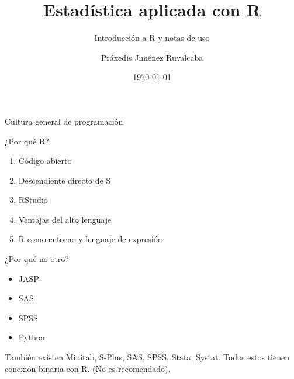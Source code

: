 \documentclass[aspectratio=169,xcolor=dvipsnames]{beamer}
\title{Estadística aplicada con R}
\subtitle{Introducción a R y notas de uso}
\author{Práxedis Jiménez Ruvalcaba}
\institute
{

}
\date{\today}
\begin{document}
\begin{frame}[c]

    \vspace{1cm}
    \begin{center}
        \insertauthor\par
        \vspace{0.5cm}
        \insertinstitute\par
        \insertdate
    \end{center}
    
\end{frame}

\begin{section}{Cultura general de programación}

\begin{frame}{¿Por qué R?}
    \begin{enumerate}
        \item Código abierto
        \item Descendiente directo de S 
        \item RStudio
        \item Ventajas del alto lenguaje
        \item R como entorno y lenguaje de expresión
    \end{enumerate} 
\end{frame}

\begin{frame}{¿Por qué no otro?}
    \begin{itemize}
        \item JASP
        \item SAS
        \item SPSS
        \item Python
    \end{itemize}
    También existen Minitab, S-Plus, SAS, SPSS, Stata, Systat. Todos estos tienen conexión binaria con R. 
    (No es recomendado).
\end{frame}

\end{section}
\end{document}
